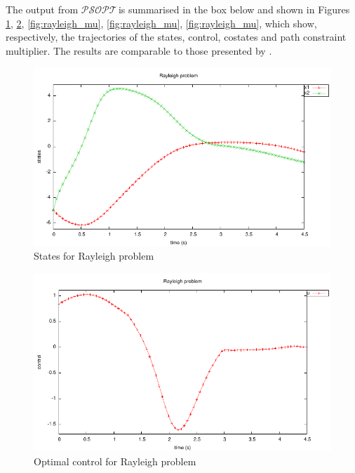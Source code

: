 \documentclass[a4paper,11pt]{report}    %
\newcommand{\psopt}{$\mathcal{PSOPT}$\,}  %
\newenvironment{shadedframe}{%
  \def\FrameCommand{\fcolorbox{black}{shadecolor}}%
  \MakeFramed {\FrameRestore}}
{\endMakeFramed}
\begin{document}
\tiny
\begin{shadedframe}

\end{shadedframe}
\normalsize

The output from \psopt is summarised in the box below and shown in Figures \ref{fig:rayleigh_states}, \ref{fig:rayleigh_control},
\ref{fig:rayleigh_mu}, \ref{fig:rayleigh_mu}, \ref{fig:rayleigh_mu}, which show, respectively, the trajectories of the states, control,
costates and path constraint multiplier. The results are comparable to those presented by \cite{Betts:10}.

\begin{shadedframe}

\end{shadedframe}

\begin{figure}
  \centering 
  \includegraphics{../examples/rayleigh/rayleigh_states.pdf}
  \caption{States for Rayleigh problem}
 \label{fig:rayleigh_states}
\end{figure}

\begin{figure}
  \centering 
  \includegraphics{../examples/rayleigh/rayleigh_control.pdf}
  \caption{Optimal control for Rayleigh problem}
 \label{fig:rayleigh_control}
\end{figure}
\end{document}
